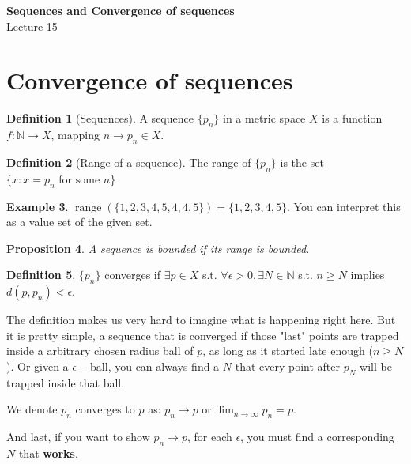 \documentclass[12pt]{article}
\newcommand{\NN}{\mathbb{N}}   %
\theoremstyle{definition}
\newtheorem{definition}{Definition}[section]
\newtheorem{example}[definition]{Example}
\theoremstyle{plain}
\newtheorem{proposition}[definition]{Proposition}
\begin{document}

\begin{center}
    {\Large \textbf{Sequences and Convergence of sequences}}\\[0.5em]
    {\large Lecture 15}
\end{center}

\tableofcontents

\newpage

\section{Convergence of sequences}
\begin{definition}[Sequences]
A sequence $\{p_n\}$ in a metric space $X$ is a function $f: \NN \rightarrow X$, mapping $n \rightarrow p_n \in X$.
\end{definition}

\begin{definition}[Range of a sequence]
The range of $\{p_n\}$ is the set $\{x: x=p_n \text{ for some } n\}$
\end{definition}

\begin{example}
$\operatorname{range}(\{1,2,3,4,5,4,4,5\}) = \{1,2,3,4,5\}$. You can interpret this as a value set of the given set.  
\end{example}

\begin{proposition}
A sequence is bounded if its range is bounded.
\end{proposition}

\begin{definition}
$\{p_n\}$ converges if $\exists p \in X$ s.t. $\forall \epsilon>0, \exists N\in\NN$ s.t. $n\ge N$ implies $d(p, p_n) < \epsilon$.
\end{definition}

\begin{note}
The definition makes us very hard to imagine what is happening right here. But it is pretty simple, a sequence that is converged if those "last" points are trapped inside a arbitrary chosen radius ball of $p$, as long as it started late enough ($n\ge N$). Or given a $\epsilon-$ball, you can always find a $N$ that every point after $p_N$ will be trapped inside that ball.

We denote $p_n$ converges to $p$ as: $p_n \rightarrow p$ or $\lim_{n \rightarrow \infty} p_n = p$.

And last, if you want to show $p_n \rightarrow p$, for each $\epsilon$, you must find a corresponding $N$ that \textbf{works}.
\end{note}
\end{document}
